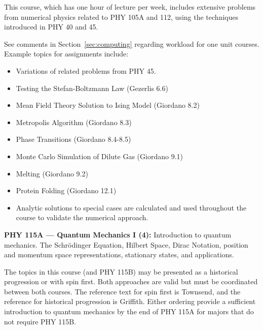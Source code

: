 \documentclass[12pt]{article}
\begin{document}
This course, which has one hour of lecture per week, includes
extensive problems from numerical physics related to PHY 105A and 112,
using the techniques introduced in PHY 40 and 45.

See comments in Section~\ref{sec:computing} regarding workload for one
unit courses.  Example topics for assignments include:
\begin{itemize}
\item Variations of related problems from PHY 45.
\item Testing the Stefan-Boltzmann Law (Gezerlis 6.6)
\item Mean Field Theory Solution to Ising Model (Giordano 8.2)
\item Metropolis Algorithm (Giordano 8.3)
\item Phase Transitions (Giordano 8.4-8.5)
\item Monte Carlo Simulation of Dilute Gas (Giordano 9.1) 
\item Melting (Giordano 9.2)
\item Protein Folding (Giordano 12.1)
\item Analytic solutions to special cases are calculated and used throughout the
  course to validate the numerical approach.
\end{itemize}



\vskip 1cm
\noindent
{\bf PHY 115A --- Quantum Mechanics I (4):}
Introduction to quantum mechanics.  The Schr\"odinger Equation, Hilbert
Space, Dirac Notation, position and momentum space representations,
stationary states, and applications.

The topics in this course (and PHY 115B) may be presented as a
historical progression or with spin first.  Both approaches are valid
but must be coordinated between both courses.  The reference text for
spin first is Townsend, and the reference for historical progression is
Griffith.  Either ordering provide a sufficient introduction to
quantum mechanics by the end of PHY 115A for majors that do not
require PHY 115B.
\end{document}
